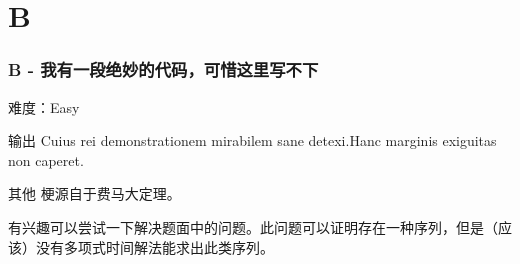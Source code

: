 \section{B}
\begin{frame}
\frametitle{B - 我有一段绝妙的代码，可惜这里写不下}
难度：Easy
\begin{block}{输出}
    Cuius rei demonstrationem mirabilem sane detexi.Hanc marginis exiguitas non caperet.
\end{block}

\begin{block}{其他}
梗源自于费马大定理。

有兴趣可以尝试一下解决题面中的问题。此问题可以证明存在一种序列，但是（应该）没有多项式时间解法能求出此类序列。
\end{block}
\end{frame}